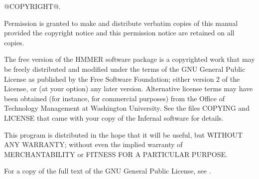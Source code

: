 \vspace*{\fill}
\begin{flushleft}
@COPYRIGHT@.\vspace{5mm}

Permission is granted to make and distribute verbatim copies of this
manual provided the copyright notice and this permission notice are
retained on all copies.\vspace{5mm}

The free version of the HMMER software package is a copyrighted work
that may be freely distributed and modified under the terms of the GNU
General Public License as published by the Free Software Foundation;
either version 2 of the License, or (at your option) any later
version. Alternative license terms may have been obtained (for
instance, for commercial purposes) from the Office of Technology
Management at Washington University. See the files COPYING and LICENSE
that came with your copy of the Infernal software for
details.\vspace{5mm}

This program is distributed in the hope that it will be useful, but
WITHOUT ANY WARRANTY; without even the implied warranty of
MERCHANTABILITY or FITNESS FOR A PARTICULAR PURPOSE.\vspace{5mm}

For a copy of the full text of the GNU General Public License, see
.
\vspace{5mm}
\end{flushleft}
